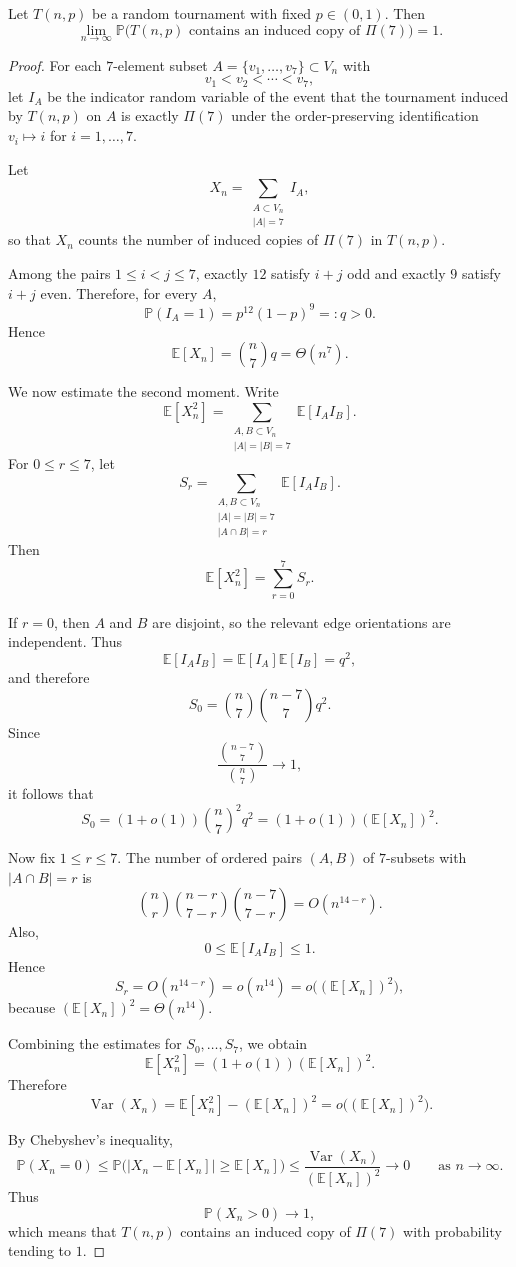 \documentclass[10pt,a4paper]{amsart}
\begin{document}
\begin{lem}\label{lem:existence}
Let $T(n,p)$ be a random tournament with fixed $p\in(0,1)$.
Then
\[
\lim_{n\to\infty}\mathbb P\bigl(T(n,p)\text{ contains an induced copy of }\Pi(7)\bigr)=1.
\]
\end{lem}

\begin{proof}
For each $7$-element subset $A=\{v_1,\dots,v_7\}\subset V_n$ with
\[
v_1<v_2<\cdots<v_7,
\]
let $I_A$ be the indicator random variable of the event that the tournament induced by $T(n,p)$ on $A$
is exactly $\Pi(7)$ under the order-preserving identification $v_i\mapsto i$ for $i=1,\dots,7$.

Let
\[
X_n=\sum_{\substack{A\subset V_n\\ |A|=7}} I_A,
\]
so that $X_n$ counts the number of induced copies of $\Pi(7)$ in $T(n,p)$.

Among the pairs $1\le i<j\le 7$, exactly $12$ satisfy $i+j$ odd and exactly $9$ satisfy $i+j$ even.
Therefore, for every $A$,
\[
\mathbb P(I_A=1)=p^{12}(1-p)^9=:q>0.
\]
Hence
\[
\mathbb E[X_n]=\binom{n}{7}q=\Theta(n^7).
\]

We now estimate the second moment.
Write
\[
\mathbb E[X_n^2]
=
\sum_{\substack{A,B\subset V_n\\ |A|=|B|=7}}
\mathbb E[I_A I_B].
\]
For $0\le r\le 7$, let
\[
S_r
=
\sum_{\substack{A,B\subset V_n\\ |A|=|B|=7\\ |A\cap B|=r}}
\mathbb E[I_A I_B].
\]
Then
\[
\mathbb E[X_n^2]=\sum_{r=0}^7 S_r.
\]

If $r=0$, then $A$ and $B$ are disjoint, so the relevant edge orientations are independent. Thus
\[
\mathbb E[I_A I_B]=\mathbb E[I_A]\mathbb E[I_B]=q^2,
\]
and therefore
\[
S_0=\binom{n}{7}\binom{n-7}{7}q^2.
\]
Since
\[
\frac{\binom{n-7}{7}}{\binom{n}{7}}\to 1,
\]
it follows that
\[
S_0=(1+o(1))\binom{n}{7}^2 q^2=(1+o(1))(\mathbb E[X_n])^2.
\]

Now fix $1\le r\le 7$.
The number of ordered pairs $(A,B)$ of $7$-subsets with $|A\cap B|=r$ is
\[
\binom{n}{r}\binom{n-r}{7-r}\binom{n-7}{7-r}=O(n^{14-r}).
\]
Also,
\[
0\le \mathbb E[I_A I_B]\le 1.
\]
Hence
\[
S_r=O(n^{14-r})=o(n^{14})=o\bigl((\mathbb E[X_n])^2\bigr),
\]
because $(\mathbb E[X_n])^2=\Theta(n^{14})$.

Combining the estimates for $S_0,\dots,S_7$, we obtain
\[
\mathbb E[X_n^2]=(1+o(1))(\mathbb E[X_n])^2.
\]
Therefore
\[
\operatorname{Var}(X_n)
=
\mathbb E[X_n^2]-(\mathbb E[X_n])^2
=
o\bigl((\mathbb E[X_n])^2\bigr).
\]

By Chebyshev's inequality,
\[
\mathbb P(X_n=0)
\le
\mathbb P\bigl(|X_n-\mathbb E[X_n]|\ge \mathbb E[X_n]\bigr)
\le
\frac{\operatorname{Var}(X_n)}{(\mathbb E[X_n])^2}
\longrightarrow 0
\qquad\text{as }n\to\infty.
\]
Thus
\[
\mathbb P(X_n>0)\longrightarrow 1,
\]
which means that $T(n,p)$ contains an induced copy of $\Pi(7)$ with probability tending to $1$.
\end{proof}
\end{document}
